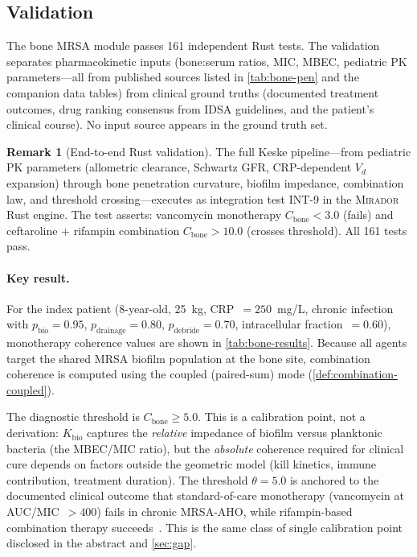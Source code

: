 \documentclass[11pt]{article}
\theoremstyle{plain}
\theoremstyle{definition}
\newtheorem{remark}[theorem]{Remark}
\newcommand{\mirador}{\textsc{Mirador}}
\begin{document}
\subsection{Validation}
\label{sec:bone-validation}

The bone MRSA module passes 161 independent Rust tests. The
validation separates pharmacokinetic inputs (bone:serum ratios,
MIC, MBEC, pediatric PK parameters---all from published sources
listed in \cref{tab:bone-pen} and the companion data tables) from
clinical ground truths (documented treatment outcomes, drug ranking
consensus from IDSA guidelines, and the patient's clinical course).
No input source appears in the ground truth set.

\begin{remark}[End-to-end Rust validation]
\label{rem:implementation-keske}
The full Keske pipeline---from pediatric PK parameters (allometric
clearance, Schwartz GFR, CRP-dependent $V_d$ expansion) through
bone penetration curvature, biofilm impedance, combination law,
and threshold crossing---executes as integration test INT-9 in the
\mirador{} Rust engine. The test asserts: vancomycin monotherapy
$C_{\mathrm{bone}} < 3.0$ (fails) and ceftaroline + rifampin
combination $C_{\mathrm{bone}} > 10.0$ (crosses threshold).
All 161 tests pass.
\end{remark}

\paragraph{Key result.}
For the index patient (8-year-old, 25~kg, CRP~$= 250$~mg/L,
chronic infection with $p_{\mathrm{bio}} = 0.95$,
$p_{\mathrm{drainage}} = 0.80$, $p_{\mathrm{debride}} = 0.70$,
intracellular fraction~$= 0.60$), monotherapy coherence values
are shown in \cref{tab:bone-results}. Because all agents target
the shared MRSA biofilm population at the bone site, combination
coherence is computed using the coupled (paired-sum) mode
(\cref{def:combination-coupled}).

The diagnostic threshold is $C_{\mathrm{bone}} \geq 5.0$. This is
a calibration point, not a derivation: $K_{\mathrm{bio}}$ captures
the \emph{relative} impedance of biofilm versus planktonic bacteria
(the MBEC/MIC ratio), but the \emph{absolute} coherence required
for clinical cure depends on factors outside the geometric model
(kill kinetics, immune contribution, treatment duration). The
threshold $\theta = 5.0$ is anchored to the documented clinical
outcome that standard-of-care monotherapy (vancomycin at
AUC/MIC~$> 400$) fails in chronic MRSA-AHO, while rifampin-based
combination therapy succeeds~\cite{Zimmerli1998}. This is the same
class of single calibration point disclosed in the abstract and
\cref{sec:gap}.
\end{document}

